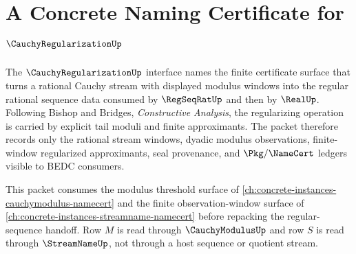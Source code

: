 \chapter{A Concrete Naming Certificate for $\CauchyRegularizationUp$}
\label{ch:concrete-instances-cauchyregularization-namecert}

The $\CauchyRegularizationUp$ interface names the finite certificate surface
that turns a rational Cauchy stream with displayed modulus windows into the
regular rational sequence data consumed by $\RegSeqRatUp$ and then by
$\RealUp$. Following Bishop and Bridges, \emph{Constructive Analysis}, the
regularizing operation is carried by explicit tail moduli and finite
approximants. The packet therefore records only the rational stream windows,
dyadic modulus observations, finite-window regularized approximants, seal
provenance, and $\Pkg/\NameCert$ ledgers visible to BEDC consumers.

This packet consumes the modulus threshold surface of
\autoref{ch:concrete-instances-cauchymodulus-namecert} and the finite
observation-window surface of
\autoref{ch:concrete-instances-streamname-namecert} before repacking the
regular-sequence handoff. Row $M$ is read through $\CauchyModulusUp$ and row
$S$ is read through $\StreamNameUp$, not through a host sequence or quotient
stream.

